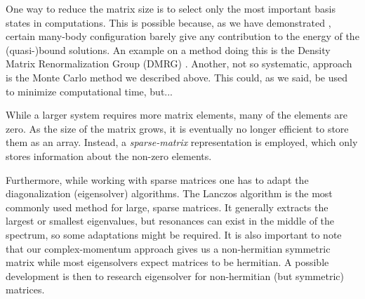 \documentclass[../main/report.tex]{subfiles}
\begin{document}
One way to reduce the matrix size is to select only the most important basis states in computations.
This is possible because, as we have demonstrated
, certain many-body configuration barely give any contribution to the energy of the (quasi-)bound solutions. 
An example on a method doing this is the Density Matrix Renormalization Group (DMRG) \cite{DMRG}.
Another, not so systematic, approach is the Monte Carlo method we described above.
This could, as we said, be used to minimize computational time, but...

While a larger system requires more matrix elements, many of the elements are zero. 
As the size of the matrix grows, it is eventually no longer efficient to store them as an array. 
Instead, a \emph{sparse-matrix} representation is employed, which only stores information about the non-zero elements. 

Furthermore, while working with sparse matrices one has to adapt the diagonalization (eigensolver) algorithms. 
The Lanczos algorithm is the most commonly used method for large, sparse matrices.
It generally extracts the largest or smallest eigenvalues, but resonances can exist in the middle of the spectrum, so some adaptations might be required.
It is also important to note that our complex-momentum approach gives us a non-hermitian symmetric matrix while most eigensolvers expect matrices to be hermitian. A possible development is then to research eigensolver for non-hermitian (but symmetric) matrices.

\end{document}

